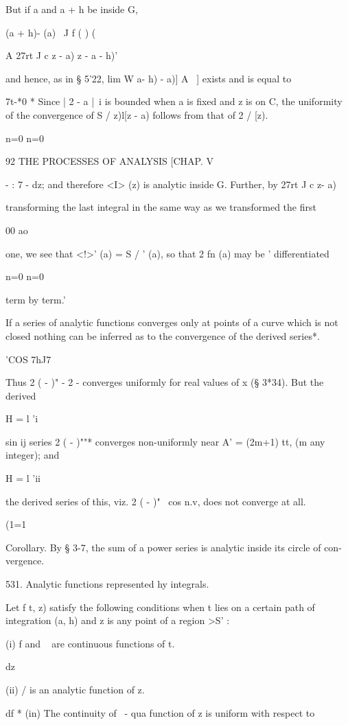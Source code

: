 {{But if a and a + h be inside G,

 (a + h)- (a) \ J f ( ) (

A 27rt J c z - a) z - a - h)'

and hence, as in § 5'22, lim W a- h) - a)] A~ ] exists and is equal to

7t-*0 * Since | 2 - a |~i is bounded when a is fixed and z is on C,
the uniformity of the convergence of S / z)l[z - a) follows from that
of 2 / [z).

n=0 n=0

92 THE PROCESSES OF ANALYSIS [CHAP. V

  - : 7 - dz; and therefore <I> (z) is analytic inside G. Further, by
27rt J c z- a)

transforming the last integral in the same way as we transformed the
first

00 ao

one, we see that <!>' (a) = S / ' (a), so that 2 fn (a) may be '
differentiated

n=0 n=0

term by term.'

If a series of analytic functions converges only at points of a curve
which is not closed nothing can be inferred as to the convergence of
the derived series*.

'COS 7hJ7

Thus 2 ( - )" - 2 - converges uniformly for real values of x (§ 3*34).
But the derived

H = l 'i

  sin ij series 2 ( - )""* converges non-uniformly near A' = (2m+1)
tt, (m any integer); and

H = l 'ii

the derived series of this, viz. 2 ( - )"~ cos n.v, does not converge
at all.

(1=1

Corollary. By § 3-7, the sum of a power series is analytic inside its
circle of con- vergence.

531. Analytic functions represented hy integrals.

Let f t, z) satisfy the following conditions when t lies on a certain
path of integration (a, h) and z is any point of a region >S' :

(i) f and ~ are continuous functions of t.

   dz

(ii) / is an analytic function of z.

df * (in) The continuity of ~- qua function of z is uniform with
respect to

}}
